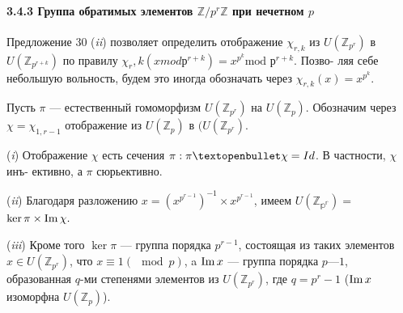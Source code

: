 \documentclass{../template/mai_book}
\begin{document}
\paragraph{3.4.3 Группа обратимых элементов	$\mathbb{Z}/p^r\mathbb{Z}$ при нечетном $p$}
\begin{lemma}
Предложение 30 (\textit{ii}) позволяет определить отображение $\chi_{r,k}$ из\linebreak
$U(\mathbb{Z}_{p^r})$ в $U(\mathbb{Z}_{p^{r+k}})$ по правилу $\chi_r,k(x mod р^{r+k}) = x^{p^k}\text{mod }р^{r + k}$. Позво-­\linebreak
ляя себе небольшую вольность, будем это иногда обозначать через\linebreak
$\chi_{r,k}(x)=x^{p^k}$.
\end{lemma}
\begin{predl}
Пусть $\pi$ — естественный гомоморфизм $U(\mathbb{Z}_{p^r})$ на $U(\mathbb{Z}_p)$. Обозначим\linebreak
через $\chi = \chi_{1,r-1}$ отображение из $U(\mathbb{Z}_p)$ в $(U(\mathbb{Z}_{p^r})$.
 
\par  (\textit{i}) Отображение $\chi$ есть сечения $\pi: \pi \textopenbullet \chi = Id$. В частности, $\chi$ инъ-\linebreak
ективно, а $\pi$ сюрьективно.
\par  (\textit{ii}) Благодаря разложению $x = {(x^{p^{r-1}})^{-1}} \times x^{p^{r-1}}$, имеем $U(\mathbb{Z_{p^r}})=$$\ker\pi \times \operatorname{Im} \chi.$
\par  (\textit{iii}) Кроме того $\ker \pi$ --- группа порядка $p^{r-1}$, состоящая из таких\linebreak
элементов $x \in U(\mathbb{Z}_{p^r})$, что $x \equiv 1 (\mod p)$, a $\operatorname{Im} x$ — группа порядка\linebreak
$p — 1$, образованная $q$-ми степенями элементов из $U(\mathbb{Z}_{p^r})$, где $q = p^r - 1$\linebreak
($\operatorname{Im} x$ изоморфна $U(\mathbb{Z}_p)$).
\end{predl}
\end{document}
